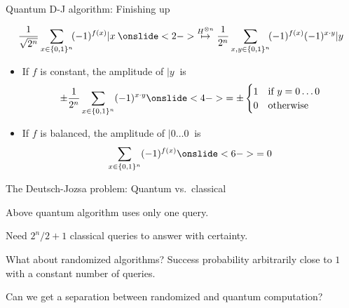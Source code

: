 
\begin{frame}{Quantum D-J algorithm: Finishing up}
  
\begin{align*}
  \frac{1}{\sqrt{2^n}} \sum_{x \in \{0,1\}^n} \! (-1)^{f(x)} |x\>
  \onslide<2->{
  \stackrel{H^{\otimes n}}{\mapsto}
  \frac{1}{2^n} \sum_{x,y \in \{0,1\}^n} \! (-1)^{f(x)} (-1)^{x \cdot y} |y\>}
\end{align*}

\begin{itemize}
  \item<3-> If $f$ is constant, the amplitude of $|y\>$ is
  \[
    \pm \frac{1}{2^n}\sum_{x \in \{0,1\}^n} (-1)^{x \cdot y}
    \onslide<4->{= \pm \begin{cases}
    1 & \text{if $y=0\ldots0$} \\
    0 & \text{otherwise}
    \end{cases}}
  \]
  \item<5-> If $f$ is balanced, the amplitude of $|0\ldots0\>$ is
  \[
    \sum_{x \in \{0,1\}^n} (-1)^{f(x)} \onslide<6->{= 0}
  \]
\end{itemize}

\end{frame}


\begin{frame}{The Deutsch-Jozsa problem: Quantum vs.\ classical}

Above quantum algorithm uses only one query.

\bigskip

Need $2^n/2 + 1$ classical queries to answer with certainty.

\pause
\bigskip

What about randomized algorithms? \pause Success probability arbitrarily close to $1$ with a constant number of queries.

\pause
\bigskip
 
Can we get a separation between randomized and quantum computation?

\end{frame}



